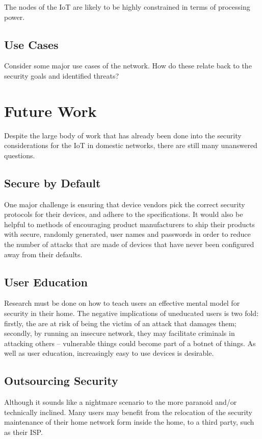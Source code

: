 \documentclass[10pt,journal,compsoc]{IEEEtran}
\begin{document}
The nodes of the IoT are likely to be highly constrained in terms of processing
power. 

\subsection{Use Cases}
Consider some major use cases of the network.
How do these relate back to the security goals and identified threats?


\section{Future Work}
Despite the large body of work that has already been done into the security
considerations for the IoT in domestic networks, there are still many
unanswered questions. 

\subsection{Secure by Default}
One major challenge is ensuring that device vendors pick the correct security
protocols for their devices, and adhere to the specifications. It would also be
helpful to methods of encouraging product manufacturers to ship their products
with secure, randomly generated, user names and passwords in order to reduce
the number of attacks that are made of devices that have never been configured
away from their defaults.

\subsection{User Education}
Research must be done on how to teach users an effective mental model for
security in their home. The negative implications of uneducated users is two
fold: firstly, the are at risk of being the victim of an attack that damages
them; secondly, by running an insecure network, they may facilitate criminals
in attacking others -- vulnerable things could become part of a botnet of
things. As well as user education, increasingly easy to use devices is
desirable. 

\subsection{Outsourcing Security}
Although it sounds like a nightmare scenario to the more paranoid and/or
technically inclined. Many users may benefit from the relocation of the
security maintenance of their home network form inside the home, to a third
party, such as their ISP. 
\end{document}
